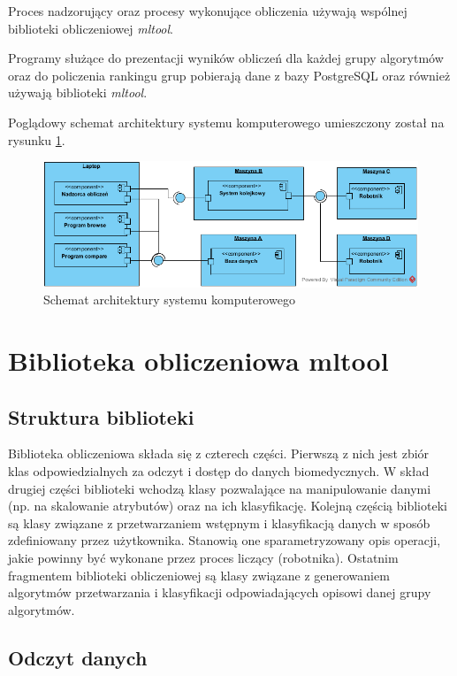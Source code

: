 \documentclass[../thesis.tex]{subfiles}
\begin{document}
Proces nadzorujący oraz procesy wykonujące obliczenia używają wspólnej biblioteki obliczeniowej \emph{mltool}. 

Programy służące do prezentacji wyników obliczeń dla każdej grupy algorytmów oraz do policzenia rankingu grup pobierają dane z bazy PostgreSQL oraz również używają biblioteki \emph{mltool}.

Poglądowy schemat architektury systemu komputerowego umieszczony został na rysunku \ref{proj:arch_diagram}.

\begin{figure}[h]
\centering
\includegraphics[width=\textwidth]{arch.png}
\caption{Schemat architektury systemu komputerowego}
\label{proj:arch_diagram}
\end{figure}

\section{Biblioteka obliczeniowa mltool}

\subsection{Struktura biblioteki}
\label{proj:sec_structure}

Biblioteka obliczeniowa składa się z czterech części. Pierwszą z nich jest zbiór klas odpowiedzialnych za odczyt i dostęp do danych biomedycznych. W skład drugiej części biblioteki wchodzą klasy pozwalające na manipulowanie danymi (np. na skalowanie atrybutów) oraz na ich klasyfikację. Kolejną częścią biblioteki są klasy związane z przetwarzaniem wstępnym i klasyfikacją danych w sposób zdefiniowany przez użytkownika. Stanowią one sparametryzowany opis operacji, jakie powinny być wykonane przez proces liczący (robotnika). Ostatnim fragmentem biblioteki obliczeniowej są klasy związane z generowaniem algorytmów przetwarzania i klasyfikacji odpowiadających opisowi danej grupy algorytmów.

\subsection{Odczyt danych}
\end{document}
